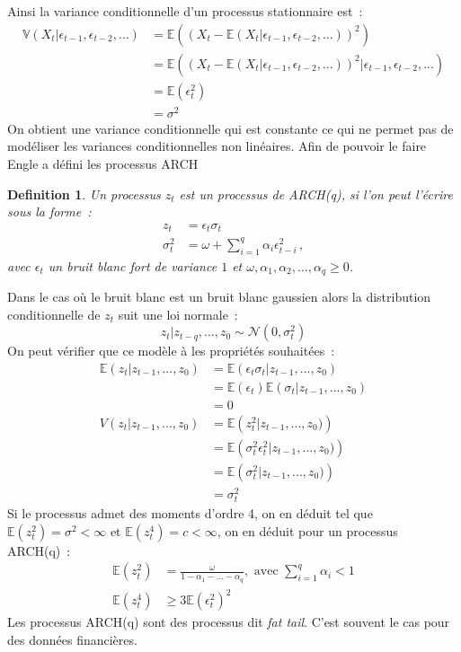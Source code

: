 \documentclass[11pt]{scrartcl} %
\newtheorem{Def}[theorem]{Definition}
\newcommand{\E}[1]{\mathbb{E}\left(#1\right)}
\begin{document}
Ainsi la variance conditionnelle d'un processus stationnaire est~:
\begin{align*}
\mathbb{V}\left(X_t|\epsilon_{t-1},\epsilon_{t-2},...\right)&= \E{\left(X_t-\E{X_t|\epsilon_{t-1},\epsilon_{t-2},...}\right)^2} \\
&= \E{\left(X_t-\E{X_t|\epsilon_{t-1},\epsilon_{t-2},...}\right)^2|\epsilon_{t-1},\epsilon_{t-2},...}\\
&= \E{\epsilon_t^2}\\
&= \sigma^2
\end{align*}
On obtient une variance conditionnelle qui est constante ce qui ne permet pas de modéliser les variances conditionnelles non linéaires. Afin de pouvoir le faire Engle \cite{archEngle} a défini les processus ARCH
\begin{Def}\label{archDef}
Un processus $z_t$ est un processus de ARCH(q), si l'on peut l'écrire sous la forme~:
\begin{align*}
z_t &= \epsilon_t\sigma_t\\
\sigma_t^2 &= \omega + \sum_{i=1}^q \alpha_i \epsilon_{t-i}^2\,,
\end{align*}
avec $\epsilon_t$ un bruit blanc fort de variance $1$ et $\omega,\alpha_1,\alpha_2,...,\alpha_q\geq 0$. 
\end{Def}
Dans le cas où le bruit blanc est un bruit blanc gaussien alors  la distribution conditionnelle de $z_t$ suit une loi normale~:
$$
z_t|z_{t-q},...,z_0\sim \mathcal{N}\left(0,\sigma_t^2\right)
$$
On peut vérifier que ce modèle à les propriétés souhaitées~:
\begin{align*}
\E{z_t|z_{t-1},...,z_0}&=\E{\epsilon_t\sigma_t|z_{t-1},...,z_0}\\
&=\E{\epsilon_t}\E{\sigma_t|z_{t-1},...,z_0}\\
&= 0\\
V(z_t|z_{t-1},...,z_0)&=\E{z_t^2|z_{t-1},...,z_0)}\\
&=\E{\sigma_t^2\epsilon_t^2|z_{t-1},...,z_0)}\\
&=\E{\sigma_t^2|z_{t-1},...,z_0)}\\
&= \sigma_t^2
\end{align*}
Si le processus admet des moments d'ordre 4, on en déduit tel que $\E{z_t^2}=\sigma^2<\infty$ et $\E{z_t^4}=c<\infty$, on en déduit pour un processus ARCH(q)~:
\begin{align*}
\E{z_t^2} &= \frac{\omega}{1-\alpha_1-...-\alpha_q},\textrm{ avec }\sum_{i=1}^q\alpha_i<1\\
\E{z_t^4}&\geq 3\E{\epsilon_t^2}^2
\end{align*}
Les processus ARCH(q) sont des processus dit \textit{fat tail}. C'est souvent le cas pour des données financières.
\end{document}
